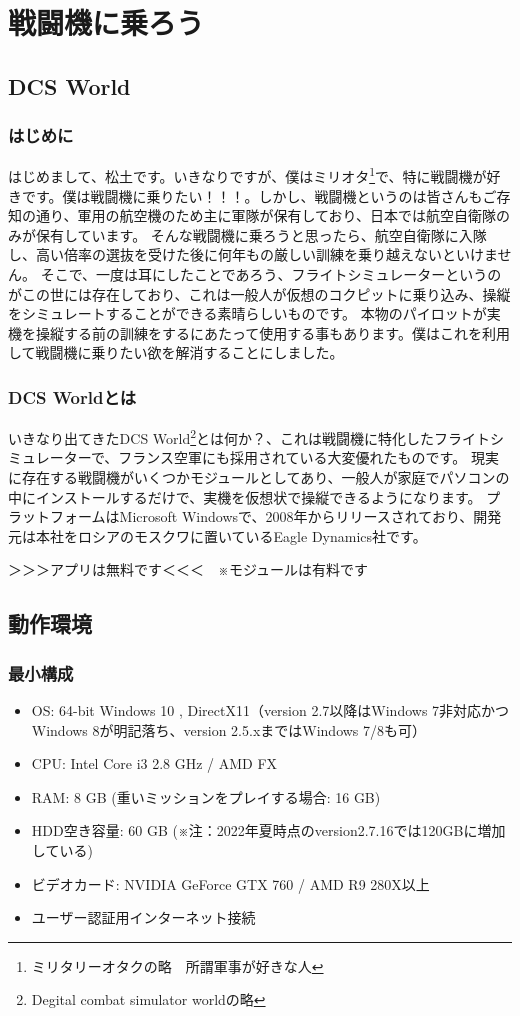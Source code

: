 \chapter{戦闘機に乗ろう}
\section{DCS World}
\subsection{はじめに}
はじめまして、松土です。いきなりですが、僕はミリオタ\footnote{ミリタリーオタクの略　所謂軍事が好きな人}で、特に戦闘機が好きです。僕は戦闘機に乗りたい！！！。しかし、戦闘機というのは皆さんもご存知の通り、軍用の航空機のため主に軍隊が保有しており、日本では航空自衛隊のみが保有しています。
そんな戦闘機に乗ろうと思ったら、航空自衛隊に入隊し、高い倍率の選抜を受けた後に何年もの厳しい訓練を乗り越えないといけません。
そこで、一度は耳にしたことであろう、フライトシミュレーターというのがこの世には存在しており、これは一般人が仮想のコクピットに乗り込み、操縦をシミュレートすることができる素晴らしいものです。
本物のパイロットが実機を操縦する前の訓練をするにあたって使用する事もあります。僕はこれを利用して戦闘機に乗りたい欲を解消することにしました。
\subsection{DCS Worldとは}
いきなり出てきたDCS World\footnote{Degital combat simulator worldの略}とは何か？、これは戦闘機に特化したフライトシミュレーターで、フランス空軍にも採用されている大変優れたものです。
現実に存在する戦闘機がいくつかモジュールとしてあり、一般人が家庭でパソコンの中にインストールするだけで、実機を仮想状で操縦できるようになります。
プラットフォームはMicrosoft Windowsで、2008年からリリースされており、開発元は本社をロシアのモスクワに置いているEagle Dynamics社です。


＞＞＞アプリは無料です＜＜＜　※モジュールは有料です
\section{動作環境}
\subsection{最小構成}
\begin{itemize}
  \item OS: 64-bit Windows 10 , DirectX11（version 2.7以降はWindows 7非対応かつWindows 8が明記落ち、version 2.5.xまではWindows 7/8も可）
  \item CPU: Intel Core i3 2.8 GHz / AMD FX
  \item RAM: 8 GB (重いミッションをプレイする場合: 16 GB)
  \item HDD空き容量: 60 GB (※注：2022年夏時点のversion2.7.16では120GBに増加している)
  \item ビデオカード: NVIDIA GeForce GTX 760 / AMD R9 280X以上
  \item ユーザー認証用インターネット接続
\end{itemize}

